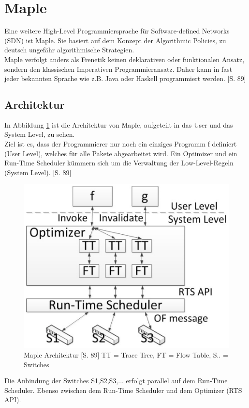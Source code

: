 \documentclass[10pt,conference]{IEEEtran}
\begin{document}
\section{Maple}
Eine weitere High-Level Programmiersprache für Software-defined Networks (SDN) ist Maple. Sie basiert auf dem Konzept der Algorithmic Policies, zu deutsch ungefähr algorithmische Strategien.\\
Maple verfolgt anders als Frenetik keinen deklarativen oder funktionalen Ansatz, sondern den klassischen Imperativen Programmieransatz. Daher kann in fast jeder bekannten Sprache wie z.B. Java oder Haskell programmiert werden. \cite{7}[S. 89]

\subsection{Architektur}
In Abbildung \ref{fig:mapleArchitecture} ist die Architektur von Maple, aufgeteilt in das User und das System Level, zu sehen.\\
Ziel ist es, dass der Programmierer nur noch ein einziges Programm f definiert (User Level), welches für alle Pakete abgearbeitet wird. Ein Optimizer und ein Run-Time Scheduler kümmern sich um die Verwaltung der Low-Level-Regeln (System Level). \cite{7}[S. 89]
\begin{figure}[h]
	\centering
	\includegraphics[width=\columnwidth]{images/mapleArchitecture.PNG}
	\caption{Maple Architektur \cite{7}[S. 89] \newline TT = Trace Tree, FT = Flow Table, S.. = Switches}
	\label{fig:mapleArchitecture}
\end{figure}
\newline
Die Anbindung der Switches S1,S2,S3,... erfolgt parallel auf dem Run-Time Scheduler. Ebenso zwischen dem Run-Time Scheduler und dem Optimizer (RTS API).
\end{document}
